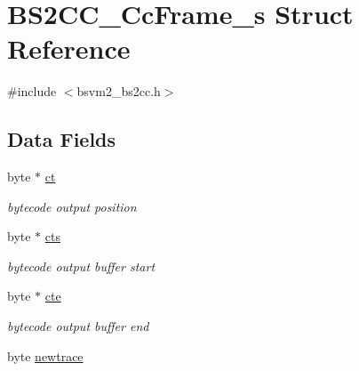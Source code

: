 \hypertarget{structBS2CC__CcFrame__s}{\section{B\-S2\-C\-C\-\_\-\-Cc\-Frame\-\_\-s Struct Reference}
\label{structBS2CC__CcFrame__s}
}


{\ttfamily \#include $<$bsvm2\-\_\-bs2cc.\-h$>$}

\subsection*{Data Fields}
\begin{DoxyCompactItemize}
\item 
\hypertarget{structBS2CC__CcFrame__s_a7095c886ed35647a28b69ad512f6daf8}{byte $\ast$ \hyperlink{structBS2CC__CcFrame__s_a7095c886ed35647a28b69ad512f6daf8}{ct}}\label{structBS2CC__CcFrame__s_a7095c886ed35647a28b69ad512f6daf8}

\begin{DoxyCompactList}\small\item\em bytecode output position \end{DoxyCompactList}\item 
\hypertarget{structBS2CC__CcFrame__s_a090c0a0dfdea379891ca02e5aff3192c}{byte $\ast$ \hyperlink{structBS2CC__CcFrame__s_a090c0a0dfdea379891ca02e5aff3192c}{cts}}\label{structBS2CC__CcFrame__s_a090c0a0dfdea379891ca02e5aff3192c}

\begin{DoxyCompactList}\small\item\em bytecode output buffer start \end{DoxyCompactList}\item 
\hypertarget{structBS2CC__CcFrame__s_a89532ac84e21277da14e2261b9951dba}{byte $\ast$ \hyperlink{structBS2CC__CcFrame__s_a89532ac84e21277da14e2261b9951dba}{cte}}\label{structBS2CC__CcFrame__s_a89532ac84e21277da14e2261b9951dba}

\begin{DoxyCompactList}\small\item\em bytecode output buffer end \end{DoxyCompactList}\item 
\hypertarget{structBS2CC__CcFrame__s_a21864d3ead989b08aadeaf07c6467f54}{byte \hyperlink{structBS2CC__CcFrame__s_a21864d3ead989b08aadeaf07c6467f54}{newtrace}}\label{structBS2CC__CcFrame__s_a21864d3ead989b08aadeaf07c6467f54}


\end{DoxyCompactItemize}
